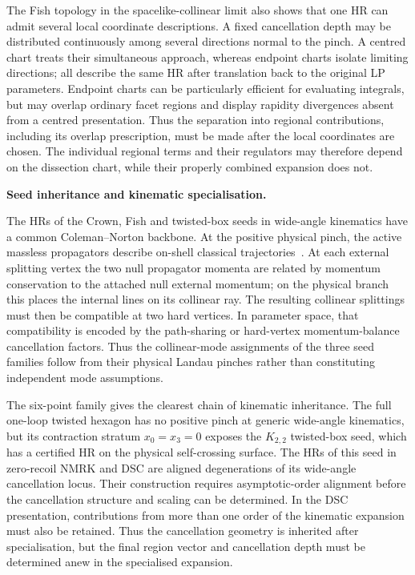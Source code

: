 \documentclass[a4paper,11pt]{article}
\begin{document}
The Fish topology in the spacelike-collinear limit also shows that one HR can
admit several local coordinate descriptions.  A fixed cancellation depth may
be distributed continuously among several directions normal to the pinch.  A
centred chart treats their simultaneous approach, whereas endpoint charts
isolate limiting directions; all describe the same HR after translation back to the original LP
parameters.  Endpoint charts can be particularly efficient for evaluating
integrals, but may overlap ordinary facet regions and display rapidity
divergences absent from a centred presentation.  Thus the separation into
regional contributions, including its overlap prescription, must be made
after the local coordinates are chosen.  The individual regional terms and
their regulators may therefore depend on the dissection chart, while their
properly combined expansion does not.

\medskip
\noindent\textbf{Seed inheritance and kinematic specialisation.}\par\nopagebreak\smallskip\nopagebreak

The HRs of the Crown, Fish and twisted-box seeds in wide-angle kinematics have
a common Coleman--Norton backbone.  At the positive physical pinch, the active
massless propagators describe on-shell classical
trajectories~\cite{Coleman:1965cn,Collins:2020euz}.  At each external
splitting vertex the two null propagator momenta are related by momentum
conservation to the attached null external momentum; on the physical branch
this places the internal lines on its collinear ray.  The resulting collinear
splittings must then be compatible at two hard vertices.  In parameter space,
that compatibility is encoded by the path-sharing or hard-vertex
momentum-balance cancellation factors.  Thus the collinear-mode assignments
of the three seed families follow from their physical Landau pinches rather than constituting
independent mode assumptions.

The six-point family gives the clearest chain of kinematic inheritance.  The
full one-loop twisted hexagon has no positive pinch at generic wide-angle
kinematics, but its contraction stratum \(x_0=x_3=0\) exposes the
\(K_{2,2}\) twisted-box seed, which has a certified HR on the physical
self-crossing surface.  The HRs of this seed in zero-recoil NMRK and DSC are
aligned degenerations of its wide-angle cancellation locus.  Their construction
requires asymptotic-order alignment before the cancellation structure and
scaling can be determined.  In the DSC presentation, contributions from more
than one order of the kinematic expansion must also be retained.  Thus the
cancellation geometry is inherited after specialisation, but the final region
vector and cancellation depth must be determined anew in the specialised
expansion.
\end{document}

